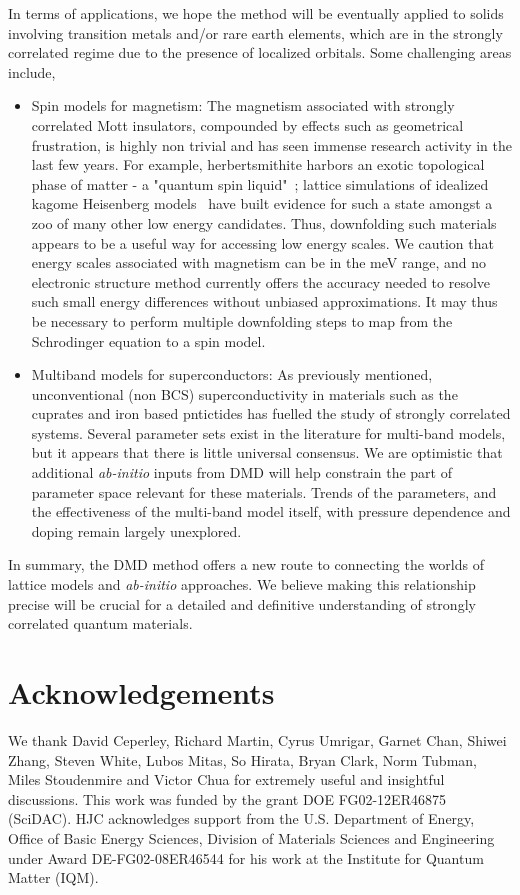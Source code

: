 In terms of applications, we hope the method will be eventually applied to solids involving transition 
metals and/or rare earth elements, which are in the strongly correlated regime due to the presence of localized orbitals. 
Some challenging areas include,
\begin{itemize} 
	\item Spin models for magnetism: 
	The magnetism associated with strongly correlated Mott insulators, compounded by effects such as geometrical frustration, 
	is highly non trivial and has seen immense research activity in the last few years. 
	For example, herbertsmithite harbors an exotic topological phase of matter - a "quantum spin liquid"~\cite{NormanRMP}; 
	lattice simulations of idealized kagome Heisenberg models~\cite{Yan_Huse_White, Changlani_kagome} have built evidence 
	for such a state amongst a zoo of many other low energy candidates. Thus, 
	downfolding such materials~\cite{Jeschke2013} appears to be a useful way for accessing low energy scales. 
	We caution that energy scales associated with magnetism can be in the meV range, and no electronic structure 
	method currently offers the accuracy needed to resolve such small energy differences without unbiased approximations. 
	It may thus be necessary to perform multiple downfolding steps to map from the Schrodinger equation to a spin model.
	\item Multiband models for superconductors:
	As previously mentioned, unconventional (non BCS) superconductivity in materials such as the cuprates and iron based 
	pntictides has fuelled the study of strongly correlated systems.
	Several parameter sets exist in the literature for multi-band models, but it appears that there is little universal consensus. 
	We are optimistic that additional \textit{ab-initio} inputs from DMD will help constrain the part of parameter 
	space relevant for these materials. Trends of the parameters, and the effectiveness of the multi-band model itself, 
	with pressure dependence and doping remain largely unexplored.  
\end{itemize} 
In summary, the DMD method offers a new route to connecting the worlds of lattice models and \textit{ab-initio} approaches. 
We believe making this relationship precise will be crucial for a detailed and definitive 
understanding of strongly correlated quantum materials. 

\section{Acknowledgements} 
We thank  David Ceperley,  Richard Martin, Cyrus Umrigar,  Garnet Chan,  Shiwei Zhang, Steven White,  
Lubos Mitas, So Hirata, Bryan Clark, Norm Tubman, Miles Stoudenmire and Victor Chua for extremely useful and insightful discussions. 
This work was funded by the grant DOE FG02-12ER46875 (SciDAC). HJC acknowledges support from the U.S. Department of Energy, 
Office of Basic Energy Sciences, Division of Materials Sciences and Engineering under Award DE-FG02-08ER46544 for his work at the Institute for Quantum Matter (IQM). 

